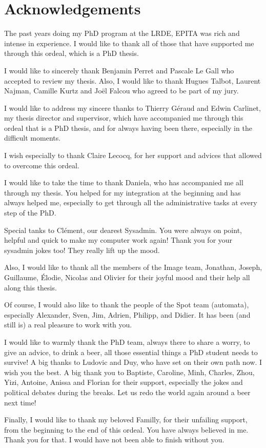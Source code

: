 \section*{Acknowledgements}
\label{sec:acknowledgement}

The past years doing my PhD program at the LRDE, EPITA was rich and intense in experience. I would like to thank all of
those that have supported me through this ordeal, which is a PhD thesis.

I would like to sincerely thank Benjamin Perret and Pascale Le Gall who accepted to review my thesis. Also, I would like
to thank Hugues Talbot, Laurent Najman, Camille Kurtz and Jo\"{e}l Falcou who agreed to be part of my jury.

I would like to address my sincere thanks to Thierry Géraud and Edwin Carlinet, my thesis director and supervisor,
which have accompanied me through this ordeal that is a PhD thesis, and for always having been there, especially in the
difficult moments.

I wish especially to thank Claire Lecocq, for her support and advices that allowed to overcome this ordeal.

I would like to take the time to thank Daniela, who has accompanied me all through my thesis. You helped for my
integration at the beginning and has always helped me, especially to get through all the administrative tasks at every
step of the PhD.

Special tanks to Cl\'{e}ment, our dearest Sysadmin. You were always on point, helpful and quick to make my computer work
again! Thank you for your sysadmin jokes too! They really lift up the mood.

Also, I would like to thank all the members of the Image team, Jonathan, Joseph, Guillaume, \'{E}lodie, Nicolas and
Olivier for their joyful mood and their help all along this thesis.

Of course, I would also like to thank the people of the Spot team (automata), especially Alexander, Sven, Jim, Adrien,
Philipp, and Didier. It has been (and still is) a real pleasure to work with you.

I would like to warmly thank the PhD team, always there to share a worry, to give an advice, to drink a beer, all those
essential things a PhD student needs to survive! A big thanks to Ludovic and Duy, who have set on their own path now. I
wish you the best. A big thank you to Baptiste, Caroline, Minh, Charles, Zhou, Yizi, Antoine, Anissa and Florian for
their support, especially the jokes and political debates during the breaks. Let us redo the world again around a beer
next time!

Finally, I would like to thank my beloved Familly, for their unfailing support, from the beginning to the end of this
ordeal. You have always believed in me. Thank you for that. I would have not been able to finish without you.

